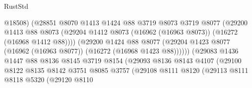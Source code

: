 \begin{lexlean}{RustStd}
\begin{coremodule}
                                      @18508)
                                    (@28851
                                      @8070
                                      @1413
                                      @1424
                                      @88
                                      @3719
                                      @8073
                                      @3719
                                      @8077
                                      (@29200
                                        @1413
                                        @88
                                        @8073
                                        (@29204
                                          @1412
                                          @8073
                                          (@16962 (@16963 @8073))
                                          (@16272 (@16968 @1412 @88))))
                                      (@29200
                                        @1424
                                        @88
                                        @8077
                                        (@29204
                                          @1423
                                          @8077
                                          (@16962 (@16963 @8077))
                                          (@16272 (@16968 @1423 @88))))))
                                  (@29083
                                    @1436
                                    @1447
                                    @88
                                    @8136
                                    @8145
                                    @3719
                                    @8154
                                    (@29093
                                      @8136
                                      @8143
                                      @4107
                                      (@29100
                                        @8122
                                        @8135
                                        @8142
                                        @3751
                                        @8085
                                        @3757
                                        (@29108
                                          @8111
                                          @8120
                                          (@29113
                                            @8111
                                            @8118
                                            @5320
                                            (@29120
                                              @8110

\end{coremodule}
\end{lexlean}
